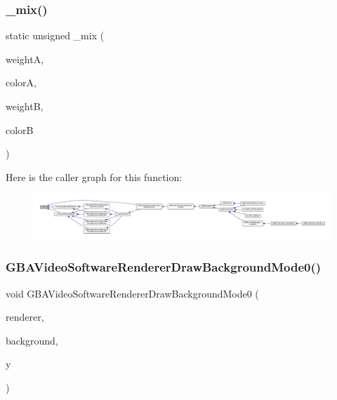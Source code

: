 \subsubsection{\texorpdfstring{\+\_\+mix()}{\_mix()}}
{\footnotesize\ttfamily static unsigned \+\_\+mix (\begin{DoxyParamCaption}\item[{\mbox{\hyperlink{ioapi_8h_a787fa3cf048117ba7123753c1e74fcd6}{int}}}]{weightA,  }\item[{unsigned}]{colorA,  }\item[{\mbox{\hyperlink{ioapi_8h_a787fa3cf048117ba7123753c1e74fcd6}{int}}}]{weightB,  }\item[{unsigned}]{colorB }\end{DoxyParamCaption})\hspace{0.3cm}{\ttfamily [static]}}

Here is the caller graph for this function\+:
\nopagebreak
\begin{figure}[H]
\begin{center}
\leavevmode
\includegraphics[width=350pt]{software-private_8h_a8ea8e737e4315c934bc23a636752df7a_icgraph}
\end{center}
\end{figure}
\mbox{\label{software-private_8h_aa2ad56e185c8e2391b4fd6bbc6835e22}} 
\subsubsection{\texorpdfstring{G\+B\+A\+Video\+Software\+Renderer\+Draw\+Background\+Mode0()}{GBAVideoSoftwareRendererDrawBackgroundMode0()}}
{\footnotesize\ttfamily void G\+B\+A\+Video\+Software\+Renderer\+Draw\+Background\+Mode0 (\begin{DoxyParamCaption}\item[{struct G\+B\+A\+Video\+Software\+Renderer $\ast$}]{renderer,  }\item[{struct G\+B\+A\+Video\+Software\+Background $\ast$}]{background,  }\item[{\mbox{\hyperlink{ioapi_8h_a787fa3cf048117ba7123753c1e74fcd6}{int}}}]{y }\end{DoxyParamCaption})}

